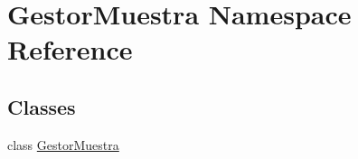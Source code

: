 \hypertarget{namespace_gestor_muestra}{}\section{Gestor\+Muestra Namespace Reference}
\label{namespace_gestor_muestra}
\subsection*{Classes}
\begin{DoxyCompactItemize}
\item 
class \mbox{\hyperlink{class_gestor_muestra_1_1_gestor_muestra}{Gestor\+Muestra}}
\end{DoxyCompactItemize}
